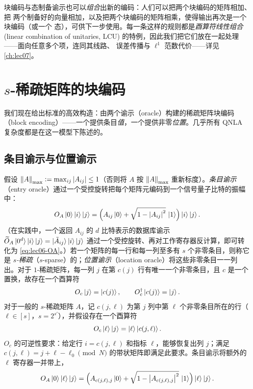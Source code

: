 块编码与态制备谕示也可以\emph{组合}出新的编码：人们可以把两个块编码的矩阵相加、把
两个制备好的向量相加，以及把两个块编码的矩阵相乘，使得输出再次是一个块编码（或一个
态），可供下一步使用。每一条这样的规则都是\emph{酉算符线性组合} (linear combination
of unitaries, LCU) 的特例，因此我们把它们放在一起处理——面向任意多个项，连同其线路、
误差传播与 $\ell^1$ 范数代价——详见 \cref{ch:lec07}。

\section{\texorpdfstring{$s$}{s}-稀疏矩阵的块编码}
\label{sec:lec06-3}

我们现在给出标准的高效构造：由两个谕示（oracle）构建的稀疏矩阵块编码（block encoding）——一个提供条目\emph{值}，一个提供非零\emph{位置}。几乎所有 QNLA 复杂度都是在这一模型下陈述的。

\subsection*{条目谕示与位置谕示}

假设 $\left\lVert A \right\rVert_{\max}\vcentcolon=\max_{ij}\left\lvert A_{ij} \right\rvert\le1$（否则将 $A$ 按
$\left\lVert A \right\rVert_{\max}$ 重新标度）。\emph{条目谕示}（entry oracle）通过一个受控旋转把每个矩阵元编码到一个信号量子比特的振幅中：
\begin{equation}
  O_A\ket{0}\ket{i}\ket{j}
   =\Bigl(A_{ij}\ket{0}+\sqrt{1-\left\lvert A_{ij} \right\rvert^2}\,\ket{1}\Bigr)\ket{i}\ket{j}.
  \label{eq:lec06-OA}
\end{equation}
（在实践中，一个返回 $A_{ij}$ 的 $d$ 比特表示的数据库谕示
$\widetilde O_A\ket{0^{d}}\ket{i}\ket{j}=\ket{\tilde A_{ij}}\ket{i}\ket{j}$ 通过一个受控旋转、再对工作寄存器反计算，即可转化为 \eqref{eq:lec06-OA}。）若一个矩阵的每一行和每一列至多有 $s$ 个非零条目，则称它是 \emph{$s$-稀疏}（$s$-sparse）的；\emph{位置谕示}（location oracle）将这些非零条目一一列出。对于 $1$-稀疏矩阵，每一列 $j$ 在第 $c(j)$ 行有唯一一个非零条目，且 $c$ 是一个置换，故存在一个酉算符
\begin{equation}
  O_c\ket{j}=\ket{c(j)},\qquad O_c^{\dagger}\ket{c(j)}=\ket{j}.
  \label{eq:lec06-Oc1}
\end{equation}
对于一般的 $s$-稀疏矩阵 $A$，记 $c(j,\ell)$ 为第 $j$ 列中第 $\ell$ 个非零条目所在的行（$\ell\in[s]$，$s=2^{s'}$），并假设存在一个酉算符
\begin{equation}
  O_c\ket{\ell}\ket{j}=\ket{\ell}\ket{c(j,\ell)}.
  \label{eq:lec06-Ocs}
\end{equation}
$O_c$ 的可逆性要求：给定行 $i=c(j,\ell)$ 和指标 $\ell$，能够恢复出列 $j$；满足
$c(j,\ell)=j+\ell-\ell_0\pmod N$ 的带状矩阵即满足此要求。条目谕示将额外的
$\ell$ 寄存器一并带上，
\begin{equation}
  O_A\ket{0}\ket{\ell}\ket{j}
   =\Bigl(A_{c(j,\ell),j}\ket{0}
     +\sqrt{1-\left\lvert A_{c(j,\ell),j} \right\rvert^2}\,\ket{1}\Bigr)\ket{\ell}\ket{j}.
  \label{eq:lec06-OAs}
\end{equation}

